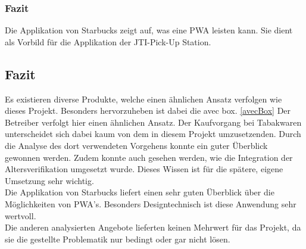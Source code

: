\subsubsection{Fazit}
Die Applikation von Starbucks zeigt auf, was eine \ac{PWA} leisten kann. Sie dient als Vorbild für die Applikation der JTI-Pick-Up Station. 


\subsection{Fazit}
Es existieren diverse Produkte, welche einen ähnlichen Ansatz verfolgen wie dieses Projekt. Besonders hervorzuheben ist dabei die avec box. \ref{avecBox} Der Betreiber verfolgt hier einen ähnlichen Ansatz. 
Der Kaufvorgang bei Tabakwaren unterscheidet sich dabei kaum von dem in diesem Projekt umzusetzenden. Durch die Analyse des dort verwendeten Vorgehens konnte ein guter Überblick gewonnen werden. Zudem konnte auch gesehen werden, wie die Integration der Altersverifikation umgesetzt wurde. Dieses Wissen ist für die spätere, eigene Umsetzung sehr wichtig. \\
Die Applikation von Starbucks liefert einen sehr guten Überblick über die Möglichkeiten von \ac{PWA}'s. Besonders Designtechnisch ist diese Anwendung sehr wertvoll.\\
Die anderen analysierten Angebote lieferten keinen Mehrwert für das Projekt, da sie die gestellte Problematik nur bedingt oder gar nicht lösen.  

\newpage 